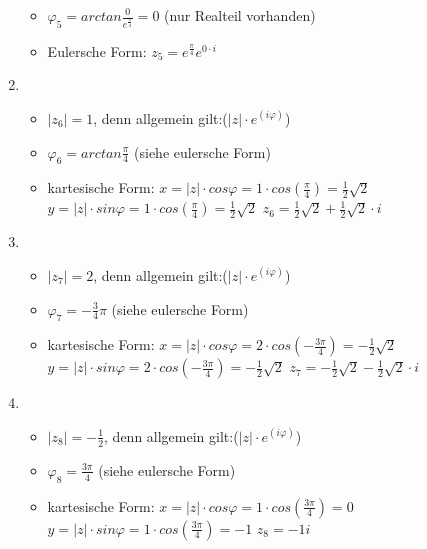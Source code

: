 \begin{enumerate}
\begin{itemize}
				\item $\varphi_{5} = arctan\frac{0}{e^{\frac{\pi}{4}}} =0$ (nur Realteil vorhanden)
				\item Eulersche Form: $z_{5} = e^{\frac{\pi}{4}} e^{0 \cdot i}$
			\end{itemize}			
	\item
			\begin{itemize}
				\item $|z_{6}|=1 $, denn allgemein gilt:($|z|\cdot e^{(i\varphi)}$)
				\item $\varphi_{6} = arctan\frac{\pi}{4}$ (siehe eulersche Form)
				\item kartesische Form: \newline
				$x=|z| \cdot cos\varphi = 1 \cdot cos(\frac{\pi}{4}) = \frac{1}{2}\sqrt{2}$\newline
				$y=|z| \cdot sin\varphi = 1 \cdot cos(\frac{\pi}{4}) = \frac{1}{2}\sqrt{2}$\newline
				$z_{6} = \frac{1}{2}\sqrt{2} + \frac{1}{2}\sqrt{2}\cdot i$
			\end{itemize}						
	\item
			\begin{itemize}
				\item $|z_{7}|=2 $, denn allgemein gilt:($|z|\cdot e^{(i\varphi)}$)
				\item $\varphi_{7} = -\frac{3}{4}\pi$ (siehe eulersche Form)
				\item kartesische Form: \newline
				$x=|z| \cdot cos\varphi = 2 \cdot cos(-\frac{3\pi}{4}) = -\frac{1}{2}\sqrt{2}$\newline
				$y=|z| \cdot sin\varphi = 2 \cdot cos(-\frac{3\pi}{4}) = -\frac{1}{2}\sqrt{2}$\newline
				$z_{7} = -\frac{1}{2}\sqrt{2} - \frac{1}{2}\sqrt{2}\cdot i$				
			\end{itemize}	
	\item
			\begin{itemize}
				\item $|z_{8}|=-\frac{1}{2} $, denn allgemein gilt:($|z|\cdot e^{(i\varphi)}$)
				\item $\varphi_{8} = \frac{3\pi}{4}$ (siehe eulersche Form)
				\item kartesische Form: \newline
				$x=|z| \cdot cos\varphi = 1 \cdot cos(\frac{3\pi}{4}) = 0$\newline
				$y=|z| \cdot sin\varphi = 1 \cdot cos(\frac{3\pi}{4}) = -1$\newline
				$z_{8} = -1i$
			\end{itemize}				
	\end{enumerate}
	
